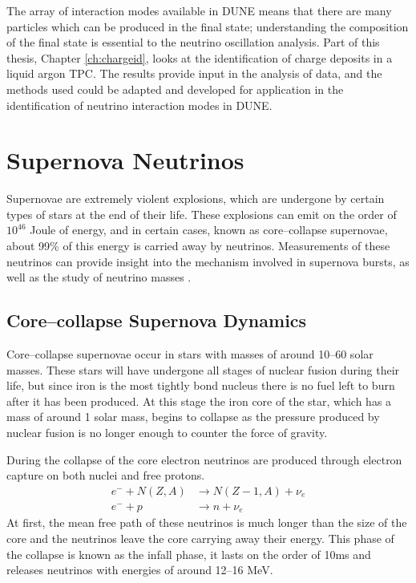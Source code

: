 The array of interaction modes available in DUNE means that there are many
particles which can be produced in the final state; understanding 
the composition of the final state is essential to the neutrino oscillation 
analysis. Part of this thesis, Chapter \ref{ch:chargeid}, looks at
the identification of charge deposits in a liquid argon TPC. The results 
provide input in the analysis of \protodune{} data, and the methods used could 
be adapted and developed for application in the identification of neutrino 
interaction modes in DUNE. 

\section{Supernova Neutrinos} \label{nu_sn}

Supernovae are extremely violent explosions, which are undergone by certain 
types of stars at the end of their life. These explosions can emit on the 
order of $10^{46}$ Joule of energy, and in certain cases, known as 
core--collapse supernovae, about 99\% of this energy is carried away by 
neutrinos.  Measurements of these neutrinos can provide insight into the 
mechanism involved in supernova bursts, as well as the study of neutrino masses
\cite{GiuntiCarlo2007FoNP}.  

\subsection{Core--collapse Supernova Dynamics}

Core--collapse supernovae occur in stars with masses of around 10--60 solar 
masses. These stars will have undergone all stages of nuclear fusion during
their life, but since iron is the most tightly bond nucleus there is no fuel 
left to burn after it has been produced. At this stage the iron core of the
star, which has a mass of around 1 solar mass, begins to collapse as the
pressure produced by nuclear fusion is no longer enough to counter the force of
gravity. 

During the collapse of the core electron neutrinos are produced through
electron capture on both nuclei and free protons.
\begin{align}
	e^- + N(Z, A) &\rightarrow N(Z - 1, A) + \nu_e \\
	e^- + p &\rightarrow n + \nu_e
\end{align}
At first, the mean free path of these neutrinos is much longer than the size of
the core and the neutrinos leave the core carrying away their energy. This phase
of the collapse is known as the infall phase, it lasts on the order of 10ms and
releases neutrinos with energies of around 12--16 MeV.

